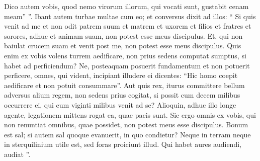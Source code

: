 \begin{biblechapter}
\begin{biblechapter}
\begin{biblechapter}
\begin{biblechapter}
\begin{biblechapter}
\begin{biblechapter}
\begin{biblechapter}
\begin{biblechapter}
\begin{biblechapter}
\begin{biblechapter}
\begin{biblechapter}
\begin{biblechapter}
\begin{biblechapter}
\begin{biblechapter}
\verse Dico autem vobis, quod nemo virorum illorum, qui vocati sunt, gustabit cenam meam” ”.
 \verse Ibant autem turbae multae cum eo; et conversus dixit ad illos: 
\verse “ Si quis venit ad me et non odit patrem suum et matrem et uxorem et filios et fratres et sorores, adhuc et animam suam, non potest esse meus discipulus. 
 \verse Et, qui non baiulat crucem suam et venit post me, non potest esse meus discipulus.
 \verse Quis enim ex vobis volens turrem aedificare, non prius sedens computat sumptus, si habet ad perficiendum? 
\verse Ne, posteaquam posuerit fundamentum et non potuerit perficere, omnes, qui vident, incipiant illudere ei 
\verse dicentes: “Hic homo coepit aedificare et non potuit consummare”. 
\verse Aut quis rex, iturus committere bellum adversus alium regem, non sedens prius cogitat, si possit cum decem milibus occurrere ei, qui cum viginti milibus venit ad se? 
 \verse Alioquin, adhuc illo longe agente, legationem mittens rogat ea, quae pacis sunt. 
\verse Sic ergo omnis ex vobis, qui non renuntiat omnibus, quae possidet, non potest meus esse discipulus.
 \verse Bonum est sal; si autem sal quoque evanuerit, in quo condietur? 
\verse Neque in terram neque in sterquilinium utile est, sed foras proiciunt illud. Qui habet aures audiendi, audiat ”.
 

\end{biblechapter}
\end{biblechapter}
\end{biblechapter}
\end{biblechapter}
\end{biblechapter}
\end{biblechapter}
\end{biblechapter}
\end{biblechapter}
\end{biblechapter}
\end{biblechapter}
\end{biblechapter}
\end{biblechapter}
\end{biblechapter}
\end{biblechapter}
